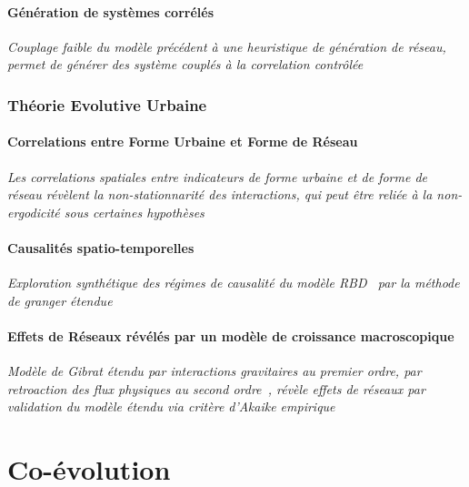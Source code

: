 \subsection{Génération de systèmes corrélés}

\textit{Couplage faible du modèle précédent à une heuristique de génération de réseau, permet de générer des système couplés à la correlation contrôlée~\cite{raimbault2016generation}}


\section{Théorie Evolutive Urbaine}

\subsection{Correlations entre Forme Urbaine et Forme de Réseau}

\textit{Les correlations spatiales entre indicateurs de forme urbaine et de forme de réseau révèlent la non-stationnarité des interactions, qui peut être reliée à la non-ergodicité sous certaines hypothèses~\cite{raimbault2016cautious}}


\subsection{Causalités spatio-temporelles}


\textit{Exploration synthétique des régimes de causalité du modèle RBD~\cite{raimbault2014hybrid} par la méthode de granger étendue} 


\subsection{Effets de Réseaux révélés par un modèle de croissance macroscopique}

\textit{Modèle de Gibrat étendu par interactions gravitaires au premier ordre, par retroaction des flux physiques au second ordre~\cite{raimbault2016models}, révèle effets de réseaux par validation du modèle étendu via critère d'Akaike empirique} 




\part{Co-évolution}

